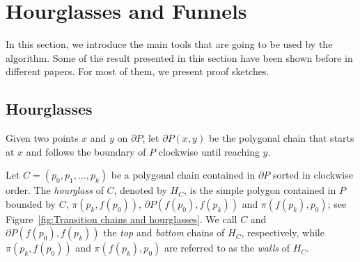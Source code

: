\documentclass[a4paper,UKenglish]{lipics}
\newcommand{\ff}[1]{\ensuremath{f(#1)}}
\newcommand{\p}[2]{\ensuremath{\pi(#1, #2)}}
\begin{document}
\section{Hourglasses and Funnels}
In this section, we introduce the main tools that are going to be used by the algorithm. Some of the result presented in this section have been shown before in different papers. For most of them, we present proof sketches.

\subsection{Hourglasses}

Given two points $x$ and $y$ on $\partial P$, let $\partial P(x,y)$ be the polygonal chain that starts at $x$ and follows the boundary of $P$ clockwise until reaching $y$.

Let $C = (p_0, p_1, \ldots, p_k)$ be a polygonal chain contained in $\partial P$ sorted in clockwise order.
The \emph{hourglass} of $C$, denoted by $H_C$, is the simple polygon contained in $P$ bounded by $C$, $\p{p_k}{\ff{p_0}}$, $\partial P(\ff{p_0}, \ff{p_k})$ and $\p{\ff{p_k}}{ p_0}$; see Figure~\ref{fig:Transition chains and hourglasses}. 
We call $C$ and $\partial P(\ff{p_0}, \ff{p_k})$ the \emph{top} and \emph{bottom} chains of $H_C$, respectively, while $\p{p_k}{ \ff{p_0}}$ and $\p{\ff{p_k}}{p_0}$ are referred to as the \emph{walls} of $H_C$.
\end{document}
